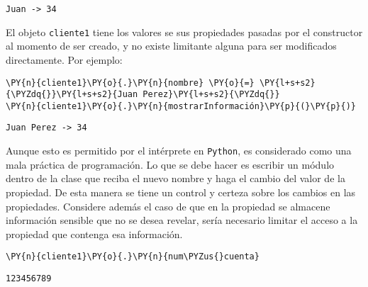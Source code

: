 \begin{Verbatim}[commandchars=\\\{\}]
Juan -> 34
\end{Verbatim}

El objeto \texttt{cliente1} tiene los valores se sus propiedades pasadas
por el constructor al momento de ser creado, y no existe limitante
alguna para ser modificados directamente. Por ejemplo:

\begin{tcolorbox}[breakable, size=fbox, boxrule=1pt, pad at break*=1mm,colback=cellbackground, colframe=cellborder]
\begin{Verbatim}[commandchars=\\\{\}]
\PY{n}{cliente1}\PY{o}{.}\PY{n}{nombre} \PY{o}{=} \PY{l+s+s2}{\PYZdq{}}\PY{l+s+s2}{Juan Perez}\PY{l+s+s2}{\PYZdq{}}
\PY{n}{cliente1}\PY{o}{.}\PY{n}{mostrarInformación}\PY{p}{(}\PY{p}{)}
\end{Verbatim}
\end{tcolorbox}

\begin{Verbatim}[commandchars=\\\{\}]
Juan Perez -> 34
\end{Verbatim}

Aunque esto es permitido por el intérprete en \texttt{Python}, es
considerado como una mala práctica de programación. Lo que se debe hacer
es escribir un módulo dentro de la clase que reciba el nuevo nombre y
haga el cambio del valor de la propiedad. De esta manera se tiene un
control y certeza sobre los cambios en las propiedades. Considere además
el caso de que en la propiedad se almacene información sensible que no
se desea revelar, sería necesario limitar el acceso a la propiedad que
contenga esa información.

\begin{tcolorbox}[breakable, size=fbox, boxrule=1pt, pad at break*=1mm,colback=cellbackground, colframe=cellborder]
\begin{Verbatim}[commandchars=\\\{\}]
\PY{n}{cliente1}\PY{o}{.}\PY{n}{num\PYZus{}cuenta}
\end{Verbatim}
\end{tcolorbox}

\begin{tcolorbox}[breakable, size=fbox, boxrule=.5pt, pad at break*=1mm, opacityfill=0]
\begin{Verbatim}[commandchars=\\\{\}]
123456789
\end{Verbatim}
\end{tcolorbox}
        
